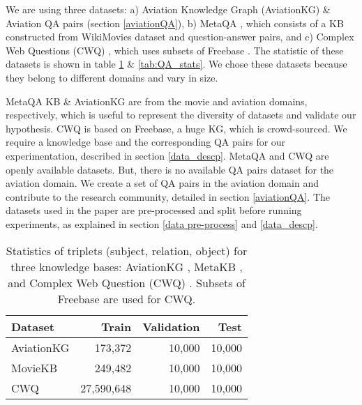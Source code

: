 \documentclass[11pt]{article}
\begin{document}
We are using three datasets: a) Aviation Knowledge Graph (AviationKG) \cite{agarwal2022knowledge} \& Aviation QA pairs (section \ref{aviationQA}), b) MetaQA \cite{zhang2018variational}, which consists of a KB constructed from WikiMovies dataset \cite{miller-etal-2016-key} and question-answer pairs, and c) Complex Web Questions (CWQ) \cite{talmor2018web}, which uses subsets of Freebase \cite{chah2017freebase}. The statistic of these datasets is shown in table \ref{tab:triplets_stats} \& \ref{tab:QA_stats}.
We chose these datasets because they belong to different domains and vary in size. 
\par
MetaQA KB \& AviationKG are from the movie and aviation domains, respectively, which is useful to represent the diversity of datasets and validate our hypothesis. CWQ is based on Freebase, a huge KG, which is crowd-sourced.
We require a knowledge base and the corresponding QA pairs for our experimentation, described in section \ref{data_descp}.
MetaQA and CWQ are openly available datasets. But, there is no available QA pairs dataset for the aviation domain. We create a set of QA pairs in the aviation domain and contribute to the research community, detailed in section \ref{aviationQA}. The datasets used in the paper are pre-processed and split before running experiments, as explained in section \ref{data pre-process} and \ref{data_descp}.


\begin{table}[!h]
  \begin{center}
    \begin{tabular}{lrrr} 
    \hline
      \textbf{Dataset} & \textbf{Train} & \textbf{Validation} & \textbf{Test}\\
      \hline
      AviationKG & 173,372 & 10,000 & 10,000\\
      MovieKB & 249,482 & 10,000 & 10,000\\
      CWQ & 27,590,648 & 10,000 & 10,000\\
      \hline
    \end{tabular}
        \caption{Statistics of triplets (subject, relation, object) for three knowledge bases: AviationKG \cite{agarwal2022knowledge}, MetaKB \cite{zhang2018variational}, and Complex Web Question (CWQ) \cite{talmor2018web}. Subsets of Freebase \cite{chah2017freebase} are used for CWQ.}
    \label{tab:triplets_stats}
  \end{center}
\end{table}
\end{document}
